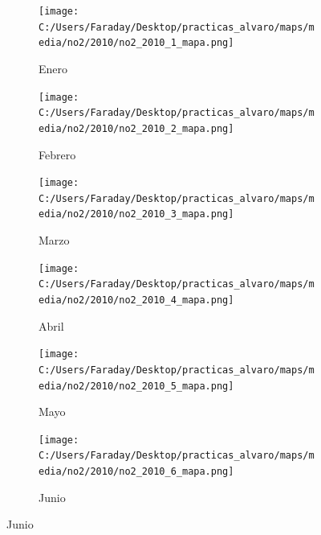 \documentclass[12pt]{article}
\begin{document}
\begin{figure}[H]
\centering
\begin{subfigure}[H]{0.15\textwidth}
\texttt{[image: C:/Users/Faraday/Desktop/practicas\_alvaro/maps/media/no2/2010/no2\_2010\_1\_mapa.png]}
\captionsetup{labelformat=empty}
\caption{Enero}
\label{fig:map-no2-2010-1}
\end{subfigure}
%
\begin{subfigure}[H]{0.15\textwidth}
\texttt{[image: C:/Users/Faraday/Desktop/practicas\_alvaro/maps/media/no2/2010/no2\_2010\_2\_mapa.png]}
\captionsetup{labelformat=empty}
\caption{Febrero}
\label{fig:map-no2-2010-2}
\end{subfigure}
%
\begin{subfigure}[H]{0.15\textwidth}
\texttt{[image: C:/Users/Faraday/Desktop/practicas\_alvaro/maps/media/no2/2010/no2\_2010\_3\_mapa.png]}
\captionsetup{labelformat=empty}
\caption{Marzo}
\label{fig:map-no2-2010-3}
\end{subfigure}
%
\begin{subfigure}[H]{0.15\textwidth}
\texttt{[image: C:/Users/Faraday/Desktop/practicas\_alvaro/maps/media/no2/2010/no2\_2010\_4\_mapa.png]}
\captionsetup{labelformat=empty}
\caption{Abril}
\label{fig:map-no2-2010-4}
\end{subfigure}
%
\begin{subfigure}[H]{0.15\textwidth}
\texttt{[image: C:/Users/Faraday/Desktop/practicas\_alvaro/maps/media/no2/2010/no2\_2010\_5\_mapa.png]}
\captionsetup{labelformat=empty}
\caption{Mayo}
\label{fig:map-no2-2010-5}
\end{subfigure}
%
\begin{subfigure}[H]{0.15\textwidth}
\texttt{[image: C:/Users/Faraday/Desktop/practicas\_alvaro/maps/media/no2/2010/no2\_2010\_6\_mapa.png]}
\captionsetup{labelformat=empty}
\caption{Junio}
\label{fig:map-no2-2010-6}
\end{subfigure}


\end{figure}
\end{document}
